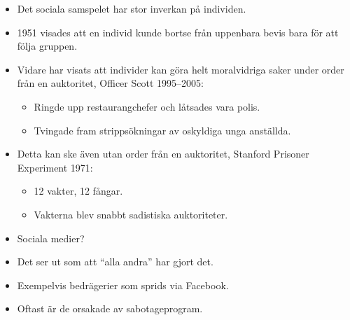 \documentclass{beamer}
\begin{document}
\begin{frame}
  \begin{itemize}
    \item Det sociala samspelet har stor inverkan på individen.

    \item 1951 visades att en individ kunde bortse från uppenbara bevis bara 
      för att följa gruppen.

      \pause{}

    \item Vidare har visats att individer kan göra helt moralvidriga saker 
      under order från en auktoritet, Officer Scott 1995--2005:
      \begin{itemize}
        \item Ringde upp restaurangchefer och låtsades vara polis.
        \item Tvingade fram strippsökningar av oskyldiga unga anställda.
      \end{itemize}

      \pause{}

    \item Detta kan ske även utan order från en auktoritet, Stanford Prisoner 
      Experiment 1971:
      \begin{itemize}
        \item 12 vakter, 12 fångar.
        \item Vakterna blev snabbt sadistiska auktoriteter.
      \end{itemize}

  \end{itemize}
\end{frame}

\begin{frame}
  \begin{itemize}
    \item Sociala medier?

      \pause{}

    \item Det ser ut som att \enquote{alla andra} har gjort det.
    \item Exempelvis bedrägerier som sprids via Facebook.
    \item Oftast är de orsakade av sabotageprogram.
  \end{itemize}
\end{frame}

%
%
%
\end{document}
